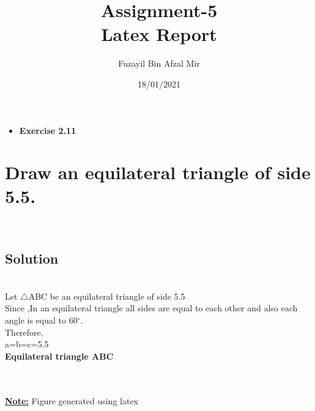 \documentclass[a4paper,12pt]{article}
\title{Assignment-5\\ Latex Report}
\author{Fuzayil Bin Afzal Mir}
\date{18/01/2021}
\begin{document}
	\maketitle
	
	
	\newpage
	\begin{itemize}
	    \item \Large\textbf{Exercise 2.11}
	\end{itemize}
	\section{Draw an equilateral triangle of side 5.5.}\\
    	
\subsection{Solution} \\
  Let $\triangle$ABC be an equilateral triangle of side 5.5\\
  Since ,In an equilateral triangle all sides are equal to each other and also each angle is equal to 60$^{\circ}$.\\
  Therefore,\\
  
  a=b=c=5.5 \hspace{2cm}{and} \\
  
\textbf{Equilateral triangle ABC}\\



\\$$$$\\
    
\textbf{\underline{Note:}} {Figure generated using latex}\\
\end{document}
